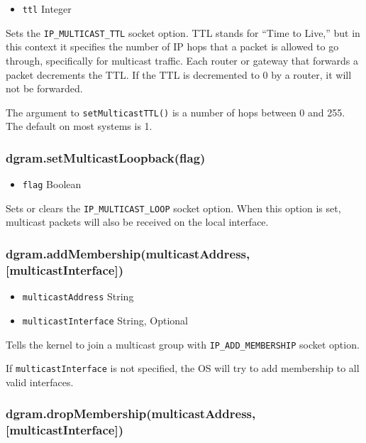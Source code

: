 \begin{itemize}
\item
  \texttt{ttl} Integer
\end{itemize}

Sets the \texttt{IP\_MULTICAST\_TTL} socket option. TTL stands for
``Time to Live,'' but in this context it specifies the number of IP hops
that a packet is allowed to go through, specifically for multicast
traffic. Each router or gateway that forwards a packet decrements the
TTL. If the TTL is decremented to 0 by a router, it will not be
forwarded.

The argument to \texttt{setMulticastTTL()} is a number of hops between 0
and 255. The default on most systems is 1.

\subsubsection{dgram.setMulticastLoopback(flag)}

\begin{itemize}
\item
  \texttt{flag} Boolean
\end{itemize}

Sets or clears the \texttt{IP\_MULTICAST\_LOOP} socket option. When this
option is set, multicast packets will also be received on the local
interface.

\subsubsection{dgram.addMembership(multicastAddress,
{[}multicastInterface{]})}

\begin{itemize}
\item
  \texttt{multicastAddress} String
\item
  \texttt{multicastInterface} String, Optional
\end{itemize}

Tells the kernel to join a multicast group with
\texttt{IP\_ADD\_MEMBERSHIP} socket option.

If \texttt{multicastInterface} is not specified, the OS will try to add
membership to all valid interfaces.

\subsubsection{dgram.dropMembership(multicastAddress,
{[}multicastInterface{]})}

